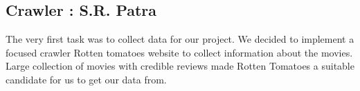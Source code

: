 \subsection{Crawler : S.R. Patra}
The very first task was to collect data for our project. We decided to implement a focused crawler Rotten tomatoes website to collect information about the movies. Large collection of movies with credible reviews made Rotten Tomatoes a suitable candidate for us to get our data from. 